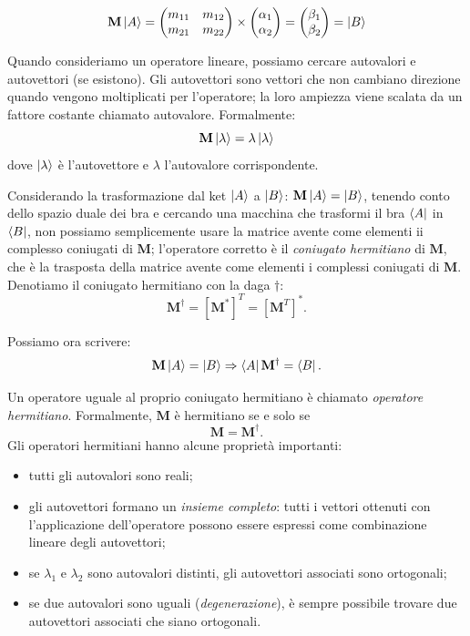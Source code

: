 \[
\mathbf{M} \Ket{A} = 
\begin{pmatrix}
	m_{11} &  m_{12}\\
	m_{21} &  m_{22}
\end{pmatrix}
\times
\begin{pmatrix}
	\alpha_{1}\\
	\alpha_{2}
\end{pmatrix}
=
\begin{pmatrix}
	\beta_{1}\\
	\beta_{2}
\end{pmatrix}
=\Ket{B}
\]

Quando consideriamo un operatore lineare, possiamo cercare autovalori e autovettori (se esistono). Gli autovettori sono vettori che non cambiano direzione quando vengono moltiplicati per l'operatore; la loro ampiezza viene scalata da un fattore costante chiamato autovalore. Formalmente:
\[
\mathbf{M}\Ket{\lambda} = \lambda\Ket{\lambda}
\]
dove $\Ket{\lambda}$ è l'autovettore e $\lambda$ l'autovalore corrispondente.

Considerando la trasformazione dal ket $\Ket{A}$ a $\Ket{B}$: $\mathbf{M} \Ket{A} = \Ket{B}$, tenendo conto dello spazio duale dei bra e cercando una macchina che trasformi il bra $\Bra{A}$ in $\Bra{B}$, non possiamo semplicemente usare la matrice avente come elementi ii complesso coniugati di $\mathbf{M}$; l'operatore corretto è il \emph{coniugato hermitiano} di $\mathbf{M}$, che è la trasposta della matrice avente come elementi i complessi coniugati di $\mathbf{M}$. Denotiamo il coniugato hermitiano con la daga $\dagger$:
\[
\mathbf{M}^\dagger =  [\mathbf{M}^*]^T = [\mathbf{M}^T]^*.
\]

Possiamo ora scrivere:
\[
\mathbf{M}\Ket{A} = \Ket{B} \Rightarrow \Bra{A}\mathbf{M}^\dagger = \Bra{B}.
\]

Un operatore uguale al proprio coniugato hermitiano è chiamato \emph{operatore hermitiano}. Formalmente, $\mathbf{M}$ è hermitiano se e solo se
\[
\mathbf{M} = \mathbf{M}^\dagger.
\]
\newpage
Gli operatori hermitiani hanno alcune proprietà importanti:
\begin{itemize}
	\item tutti gli autovalori sono reali;
	\item gli autovettori formano un \emph{insieme completo}: tutti i vettori ottenuti con l'applicazione dell'operatore possono essere espressi come combinazione lineare degli autovettori;
	\item se $\lambda_1$ e $\lambda_2$ sono autovalori distinti, gli autovettori associati sono ortogonali;
	\item se due autovalori sono uguali (\emph{degenerazione}), è sempre possibile trovare due autovettori associati che siano ortogonali.
\end{itemize}

